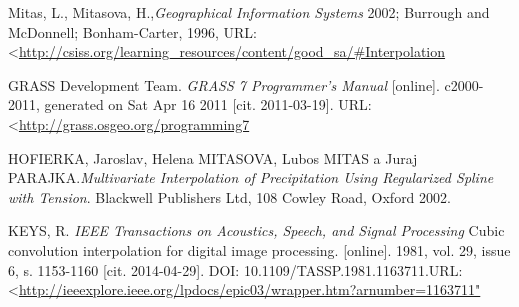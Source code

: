 \documentclass[a4paper,12pt,oneside]{report}
\begin{document}
\begin{thebibliography}{99}
Mitas, L., Mitasova, H.,\textit{Geographical Information Systems}
2002; Burrough and McDonnell; Bonham-Carter, 1996, URL: \textless\url {http://csiss.org/learning_resources/content/good_sa/#Interpolation}


GRASS Development Team.\textit{ GRASS 7 Programmer’s Manual}
[online]. c2000-2011, generated on Sat Apr 16 2011 [cit. 2011-03-19]. URL:\textless\url {http://grass.osgeo.org/programming7  }

HOFIERKA, Jaroslav, Helena  MITASOVA, Lubos MITAS a Juraj PARAJKA.\textit{Multivariate Interpolation of Precipitation Using Regularized Spline with Tension}. Blackwell Publishers Ltd, 108 Cowley Road, Oxford 2002. 

KEYS, R. \textit{ IEEE Transactions on Acoustics, Speech, and Signal Processing}
Cubic convolution interpolation for digital image processing. [online]. 1981, vol. 29, issue 6, s. 1153-1160 [cit. 2014-04-29]. DOI: 10.1109/TASSP.1981.1163711.URL:\textless\url {http://ieeexplore.ieee.org/lpdocs/epic03/wrapper.htm?arnumber=1163711"}



\end{thebibliography}
\end{document}
